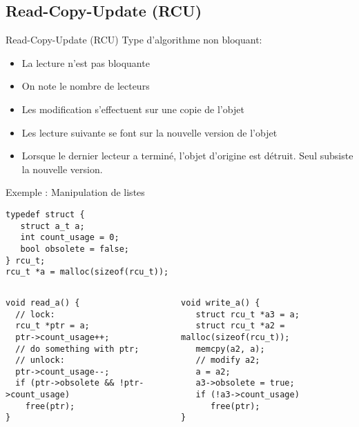 \subsection{Read-Copy-Update (RCU)}

\begin{frame}{Read-Copy-Update (RCU)}
  Type d'algorithme non bloquant:
  \begin{itemize} 
  \item La lecture n'est pas bloquante
  \item On note le nombre de lecteurs
  \item Les modification s'effectuent sur une copie de l'objet
  \item Les lecture suivante se font sur la nouvelle version de l'objet
  \item Lorsque  le dernier lecteur  a terminé, l'objet  d'origine est
    détruit. Seul subsiste la nouvelle version.
  \end{itemize} 
\end{frame}

\begin{frame}[fragile]{Exemple : Manipulation de listes} 
  \begin{center}
    \begin{lstlisting}[basicstyle=\ttfamily\scriptsize\color{colBasic},commentstyle=\scriptsize\itshape\color{colComments},numbers=none]
typedef struct {
   struct a_t a;
   int count_usage = 0;
   bool obsolete = false;
} rcu_t;
rcu_t *a = malloc(sizeof(rcu_t)); 
    \end{lstlisting}
  \end{center}
  \begin{columns}
    \begin{column}{5cm}
      \begin{lstlisting}[basicstyle=\ttfamily\scriptsize\color{colBasic},commentstyle=\scriptsize\itshape\color{colComments},numbers=none]
void read_a() {
  // lock:
  rcu_t *ptr = a;
  ptr->count_usage++;
  // do something with ptr;
  // unlock:
  ptr->count_usage--;
  if (ptr->obsolete && !ptr->count_usage)
    free(ptr);
}
      \end{lstlisting}
    \end{column}
    \begin{column}{5cm}
      \begin{lstlisting}[basicstyle=\ttfamily\scriptsize\color{colBasic},commentstyle=\scriptsize\itshape\color{colComments},numbers=none]
void write_a() { 
   struct rcu_t *a3 = a;
   struct rcu_t *a2 = malloc(sizeof(rcu_t));
   memcpy(a2, a);
   // modify a2;   
   a = a2;  
   a3->obsolete = true;
   if (!a3->count_usage)
      free(ptr);
}
      \end{lstlisting} 
    \end{column}
  \end{columns}
\end{frame} 

